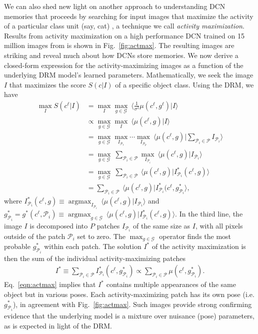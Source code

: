 \documentclass[12pt]{article}
\DeclareMathOperator*{\argmax}{argmax}
\newcommand{\G}[0]{{ \mathcal{G} }}
\newcommand{\Pa}[0]{{ \mathcal{P} }}
\begin{document}
We can also shed new light on another approach to understanding DCN memories that proceeds by searching for input images that maximize the activity of a particular class unit (say, cat) \cite{simonyan2013deep}, a technique we call \emph{activity maximization}. Results from activity maximization on a high performance DCN trained on 15 million images from \cite{simonyan2013deep} is shown in Fig.~\ref{fig:actmax}. The resulting images are striking and reveal much about how DCNs store memories.   We now derive a closed-form expression for the activity-maximizing images as a function of the underlying DRM model's learned parameters. Mathematically, we seek the image $I$ that maximizes the score $S(c|I)$ of a specific object class. Using the DRM, we have
\begin{align} 
	 \max_{I} S(c^{\ell} | I) &=\max_{I} \max_{g\in \G} \: \langle \frac{1}{\sigma^{2}}\mu(c^{\ell},g^{\ell}) | I \rangle \nonumber\\
	 		         &\propto \max_{g\in \G} \max_{I} \: \langle \mu(c^{\ell},g) | I \rangle 
			         \nonumber\\
				&= \max_{g\in \G} \max_{I_{\Pa_{1}}} \cdots \max_{I_{\Pa_{p}}} \: \langle \mu(c^{\ell},g) | \sum_{\Pa_{i} \in \Pa} I_{\Pa_{i}} \rangle
				\nonumber\\
				&= \max_{g\in \G} \: \sum_{\Pa_{i} \in \Pa} \max_{I_{\Pa_{i}}} \: \langle \mu(c^{\ell},g) |  I_{\Pa_{i}} \rangle 
				\nonumber\\
				&= \max_{g\in \G} \: \sum_{\Pa_{i} \in \Pa} \: \langle \mu(c^{\ell},g) |  I^{*}_{\Pa_{i}}(c^{\ell},g) \rangle 
				\nonumber\\
				&= \sum_{\Pa_{i} \in \Pa} \: \langle \mu(c^{\ell},g) |  I^{*}_{\Pa_{i}}(c^{\ell},g^{*}_{\Pa_{i}} \rangle ,
\end{align}
\sloppy
where $I^{*}_{\Pa_{i}}(c^{\ell},g) \equiv \argmax_{I_{\Pa_{i}}} \: \langle \mu(c^{\ell},g) | I_{\Pa_{i}} \rangle$ and $g^{*}_{\Pa_{i}}=g^{*}(c^{\ell},\Pa_{i}) \equiv \argmax_{g \in \G} \: \langle \mu(c^{\ell},g) | I^{*}_{\Pa_{i}}(c^{\ell},g)  \rangle$. In the third line, the image $I$ is decomposed into $P$ patches $I_{\Pa_{i}}$ of the same size as $I$, with all pixels outside of the patch $\Pa_{i}$ set to zero. The $\max_{g \in \G}$ operator finds the most probable $g^{*}_{\Pa_{i}}$ within each patch. The solution $I^{*}$ of the activity maximization is then the sum of the individual activity-maximizing patches
\begin{align} 
	I^{*} \equiv \sum_{\Pa_{i} \in \Pa} I^{*}_{\Pa_{i}}(c^{\ell},g^{*}_{\Pa_{i}}) \propto \sum_{\Pa_{i} \in \Pa} \mu(c^{\ell},g^{*}_{\Pa_{i}}).  \label{eqn:actmax}									
\end{align}
Eq.~\ref{eqn:actmax} implies that $I^{*}$ contains multiple appearances of the same object but in various poses. Each activity-maximizing patch has its own pose (i.e. $g^{*}_{\Pa_{i}}$), in agreement with Fig.~\ref{fig:actmax}. Such images provide strong confirming evidence that the underlying model is a mixture over nuisance (pose) parameters, as is expected in light of the DRM.
\end{document}
